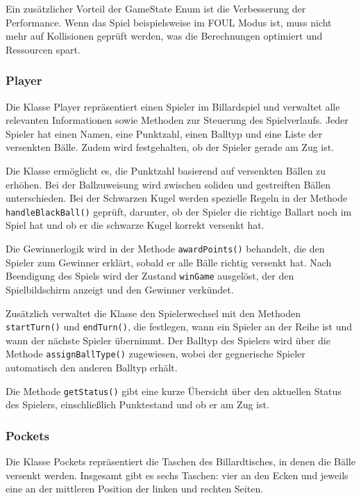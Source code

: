 \documentclass[a4paper,12pt]{article}
\begin{document}
	Ein zusätzlicher Vorteil der GameState Enum ist die Verbesserung der Performance. Wenn das Spiel beispielsweise im FOUL Modus ist, muss nicht mehr auf Kollisionen geprüft werden, was die Berechnungen optimiert und Ressourcen spart.
	
	
	\subsubsection{Player}
	
	Die Klasse Player repräsentiert einen Spieler im Billardspiel und verwaltet alle relevanten Informationen sowie Methoden zur Steuerung des Spielverlaufs. Jeder Spieler hat einen Namen, eine Punktzahl, einen Balltyp und eine Liste der versenkten Bälle. Zudem wird festgehalten, ob der Spieler gerade am Zug ist.
	
	Die Klasse ermöglicht es, die Punktzahl basierend auf versenkten Bällen zu erhöhen. Bei der Ballzuweisung wird zwischen soliden und gestreiften Bällen unterschieden. Bei der Schwarzen Kugel werden spezielle Regeln in der Methode \texttt{handleBlackBall()} geprüft, darunter, ob der Spieler die richtige Ballart noch im Spiel hat und ob er die schwarze Kugel korrekt versenkt hat.
	
	Die Gewinnerlogik wird in der Methode \texttt{awardPoints()} behandelt, die den Spieler zum Gewinner erklärt, sobald er alle Bälle richtig versenkt hat. Nach Beendigung des Spiels wird der Zustand \texttt{winGame} ausgelöst, der den Spielbildschirm anzeigt und den Gewinner verkündet.
	
	Zusätzlich verwaltet die Klasse den Spielerwechsel mit den Methoden \texttt{startTurn()} und \texttt{endTurn()}, die festlegen, wann ein Spieler an der Reihe ist und wann der nächste Spieler übernimmt. Der Balltyp des Spielers wird über die Methode \texttt{assignBallType()} zugewiesen, wobei der gegnerische Spieler automatisch den anderen Balltyp erhält.
	
	Die Methode \texttt{getStatus()} gibt eine kurze Übersicht über den aktuellen Status des Spielers, einschließlich Punktestand und ob er am Zug ist.
	
	
	
\subsubsection{Pockets}

Die Klasse Pockets repräsentiert die Taschen des Billardtisches, in denen die Bälle versenkt werden. Insgesamt gibt es sechs Taschen: vier an den Ecken und jeweils eine an der mittleren Position der linken und rechten Seiten.
\end{document}
